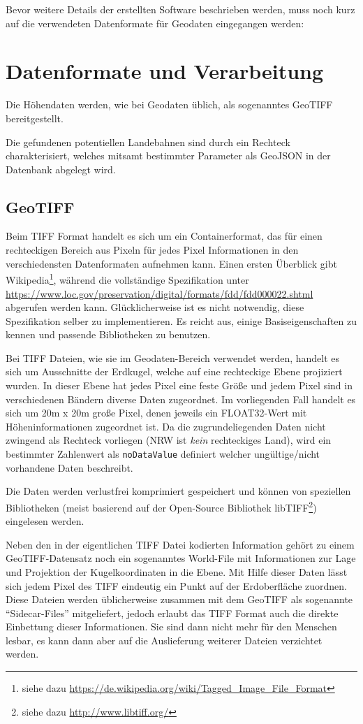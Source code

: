 \documentclass[10pt,a4paper]{report}
\newcommand*{\skippingparagraph}{\par\vspace{1.0\baselineskip}\noindent}
\begin{document}
\skippingparagraph
Bevor weitere Details der erstellten Software beschrieben werden, muss noch kurz auf die verwendeten Datenformate für Geodaten eingegangen werden:

\section{Datenformate und Verarbeitung}
Die Höhendaten werden, wie bei Geodaten üblich, als sogenanntes GeoTIFF bereitgestellt. 

Die gefundenen potentiellen Landebahnen sind durch ein Rechteck charakterisiert, welches mitsamt bestimmter Parameter als GeoJSON in der Datenbank abgelegt wird.

\subsection{GeoTIFF}
Beim TIFF Format handelt es sich um ein Containerformat, das für einen rechteckigen Bereich aus Pixeln für jedes Pixel Informationen in den verschiedensten Datenformaten aufnehmen kann. Einen ersten Überblick gibt Wikipedia\footnote{siehe dazu \url{https://de.wikipedia.org/wiki/Tagged_Image_File_Format}}, während die vollständige Spezifikation unter \url{https://www.loc.gov/preservation/digital/formats/fdd/fdd000022.shtml} abgerufen werden kann. Glücklicherweise ist es nicht notwendig, diese Spezifikation selber zu implementieren. Es reicht aus, einige Basiseigenschaften zu kennen und passende Bibliotheken zu benutzen.

Bei TIFF Dateien, wie sie im Geodaten-Bereich verwendet werden, handelt es sich um Ausschnitte der Erdkugel, welche auf eine rechteckige Ebene projiziert wurden. In dieser Ebene hat jedes Pixel eine feste Größe und jedem Pixel sind in verschiedenen Bändern diverse Daten zugeordnet. Im vorliegenden Fall handelt es sich um 20m x 20m große Pixel, denen jeweils ein FLOAT32-Wert mit Höheninformationen zugeordnet ist.
Da die zugrundeliegenden Daten nicht zwingend als Rechteck vorliegen (NRW ist \emph{kein} rechteckiges Land), wird ein bestimmter Zahlenwert als \verb|noDataValue| definiert welcher ungültige/nicht vorhandene Daten beschreibt.

Die Daten werden verlustfrei komprimiert gespeichert und können von speziellen Bibliotheken (meist basierend auf der Open-Source Bibliothek libTIFF\footnote{siehe dazu \url{http://www.libtiff.org/}}) eingelesen werden.

Neben den in der eigentlichen TIFF Datei kodierten Information gehört zu einem GeoTIFF-Datensatz noch ein sogenanntes World-File mit Informationen zur Lage und Projektion der Kugelkoordinaten in die Ebene. Mit Hilfe dieser Daten lässt sich jedem Pixel des TIFF eindeutig ein Punkt auf der Erdoberfläche zuordnen. Diese Dateien werden üblicherweise zusammen mit dem GeoTIFF als sogenannte "`Sidecar-Files"' mitgeliefert, jedoch erlaubt das TIFF Format auch die direkte Einbettung dieser Informationen. Sie sind dann nicht mehr für den Menschen lesbar, es kann dann aber auf die Auslieferung weiterer Dateien verzichtet werden. 
\end{document}
